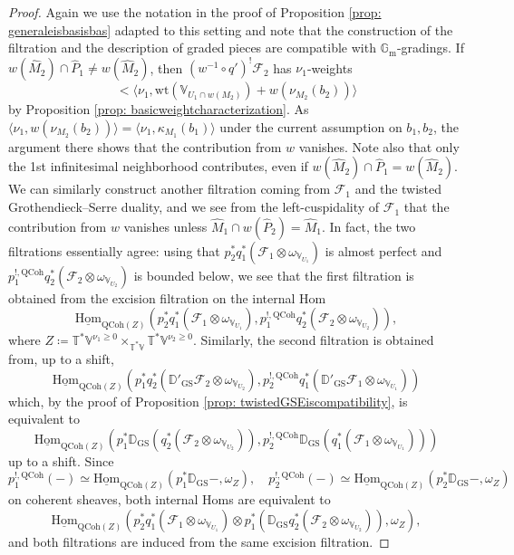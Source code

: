 \documentclass{amsart}
\theoremstyle{definition}
\theoremstyle{remark}
\numberwithin{equation}{section}
\newcommand{\mc}{\mathcal}
\newcommand{\Gm}{{\mathbb{G}_{\mathrm{m}}}}
\newcommand{\Hom}{\mathrm{Hom}}
\newcommand{\wh}{\widehat}
\newcommand{\D}{\mathbb{D}}
\newcommand{\QCoh}{\mathrm{QCoh}}
\newcommand{\GS}{\mathrm{GS}}
\newcommand{\V}{\mathbb{V}}
\newcommand{\T}{\mathbb{T}}
\newcommand{\wt}{\mathrm{wt}}
\begin{document}
\begin{proof}
Again we use the notation in the proof of Proposition \ref{prop: generaleisbasisbas} adapted to this setting and note that the construction of the filtration and the description of graded pieces are compatible with $\Gm$-gradings. If $w(\wh M_2)\cap \wh P_1\neq w(\wh M_2)$, then $(w^{-1}\circ q')^! \mc F_2$ has $\nu_1$-weights
\[
< \langle \nu_1, \wt(\V_{U_1\cap w(M_2)}) + w (\nu_{M_2} (b_2)) \rangle 
\]
by Proposition \ref{prop: basicweightcharacterization}. As $\langle \nu_1, w (\nu_{M_2} (b_2))\rangle=\langle \nu_1, \kappa_{M_1} (b_1)\rangle$ under the current assumption on $b_1, b_2$, the argument there shows that the contribution from $w$ vanishes. Note also that only the 1st infinitesimal neighborhood contributes, even if $w(\wh M_2)\cap \wh P_1= w(\wh M_2)$. We can similarly construct another filtration coming from $\mc F_1$ and the twisted Grothendieck--Serre duality, and we see from the left-cuspidality of $\mc F_1$ that the contribution from $w$ vanishes unless $\wh M_1\cap w(\wh P_2)=\wh M_1$. In fact, the two filtrations essentially agree: using that $p_2^* q_1^* (\mc F_1\otimes \omega_{\V_{U_1}})$ is almost perfect and $p_1^{!,\QCoh}q_2^* (\mc F_2 \otimes \omega_{\V_{U_2}})$ is bounded below, we see that the first filtration is obtained from the excision filtration on the internal Hom
\[
\underline{\Hom}_{\QCoh(Z)}(p_2^* q_1^* (\mc F_1\otimes \omega_{\V_{U_1}}), p_1^{!,\QCoh}q_2^* (\mc F_2 \otimes \omega_{\V_{U_2}})),
\]
where $Z\coloneq \T^\ast \V^{\nu_1\geq 0}\times_{\T^* \V}\T^\ast \V^{\nu_2\geq 0}$. Similarly, the second filtration is obtained from, up to a shift,
\[
\underline{\Hom}_{\QCoh(Z)}(p_1^* q_2^* (\D'_{\GS}\mc F_2\otimes \omega_{\V_{U_2}}), p_2^{!,\QCoh}q_1^* (\D'_{\GS}\mc F_1 \otimes \omega_{\V_{U_1}}))
\]
which, by the proof of Proposition \ref{prop: twistedGSEiscompatibility}, is equivalent to
\[
\underline{\Hom}_{\QCoh(Z)}(p_1^* \D_\GS (q_2^* (\mc F_2\otimes \omega_{\V_{U_2}})), p_2^{!,\QCoh}\D_{\GS} (q_1^* (\mc F_1 \otimes \omega_{\V_{U_1}})))
\]
up to a shift. Since
\[
p_1^{!,\QCoh}(-)\simeq \underline{\Hom}_{\QCoh(Z)}(p_1^*\D_{\GS}-,\omega_Z), \quad
p_2^{!,\QCoh}(-)\simeq \underline{\Hom}_{\QCoh(Z)}(p_2^*\D_{\GS}-,\omega_Z)
\]
on coherent sheaves, both internal Homs are equivalent to
\[
\underline{\Hom}_{\QCoh(Z)}(p_2^* q_1^* (\mc F_1\otimes \omega_{\V_{U_1}}) \otimes p_1^* (\D_\GS q_2^* (\mc F_2\otimes \omega_{\V_{U_2}})), \omega_Z), 
\]
and both filtrations are induced from the same excision filtration. 


\end{proof}
\end{document}
